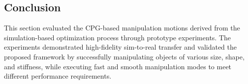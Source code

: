\subsection{Conclusion}

This section evaluated the CPG-based manipulation motions derived from the simulation-based optimization process through prototype experiments. The experiments demonstrated high-fidelity sim-to-real transfer and validated the proposed framework by successfully manipulating objects of various size, shape, and stiffness, while executing fast and smooth manipulation modes to meet different performance requirements.
